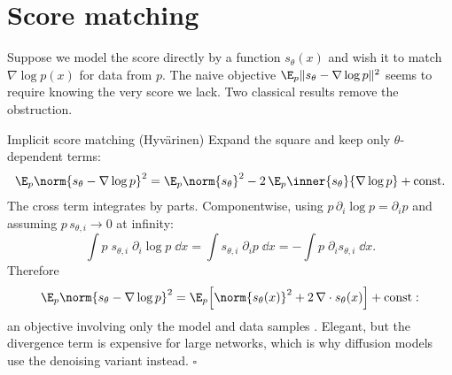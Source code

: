 \section{Score matching}\label{sec:score-matching}

Suppose we model the score directly by a function $s_\theta(x)$ and wish
it to match $\nabla \log p(x)$ for data from $p$. The naive objective
$\E_p \| s_\theta - \nabla \log p \|^2$ seems to require knowing the very
score we lack. Two classical results remove the obstruction.

\begin{toolbox}{Implicit score matching (Hyv\"arinen)}
Expand the square and keep only $\theta$-dependent terms:
\begin{equation*}
  \E_p \norm{s_\theta - \nabla \log p}^2
  = \E_p \norm{s_\theta}^2
  - 2\, \E_p \inner{s_\theta}{\nabla \log p}
  + \text{const}.
\end{equation*}
The cross term integrates by parts. Componentwise, using
$p\,\partial_i \log p = \partial_i p$ and assuming
$p\, s_{\theta,i} \to 0$ at infinity:
\begin{equation*}
  \int p\; s_{\theta,i}\; \partial_i \log p \;\dd x
  = \int s_{\theta,i}\; \partial_i p \;\dd x
  = - \int p\; \partial_i s_{\theta,i} \;\dd x .
\end{equation*}
Therefore
\begin{equation*}
  \E_p \norm{s_\theta - \nabla \log p}^2
  = \E_p\Big[ \norm{s_\theta(x)}^2
    + 2\, \nabla \cdot s_\theta(x) \Big] + \text{const} :
\end{equation*}
an objective involving only the model and data samples
\citep{hyvarinen2005estimation}. Elegant, but the divergence term is
expensive for large networks, which is why diffusion models use the
denoising variant instead. \hfill$\square$
\end{toolbox}

